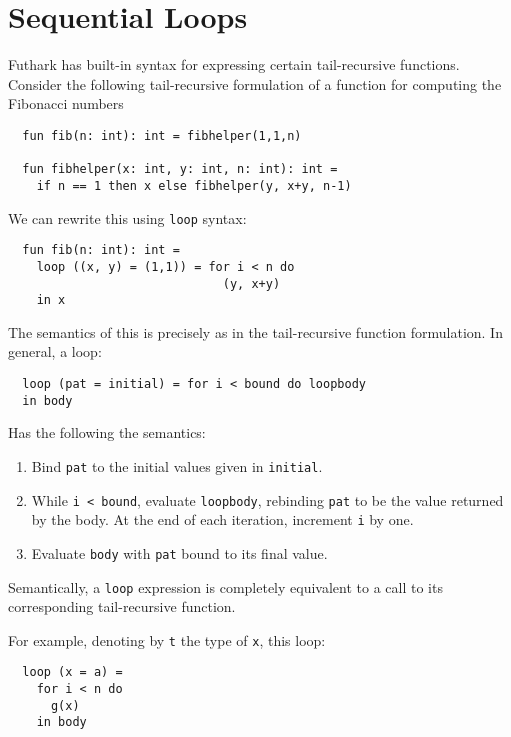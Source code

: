 \documentclass[11pt]{book}
\begin{document}
\section{Sequential Loops}
\label{sec:sequential-loops}

Futhark has built-in syntax for expressing certain tail-recursive
functions.  Consider the following tail-recursive formulation of a
function for computing the Fibonacci numbers

\begin{lstlisting}
  fun fib(n: int): int = fibhelper(1,1,n)

  fun fibhelper(x: int, y: int, n: int): int =
    if n == 1 then x else fibhelper(y, x+y, n-1)
\end{lstlisting}

We can rewrite this using \texttt{loop} syntax:

\begin{lstlisting}
  fun fib(n: int): int =
    loop ((x, y) = (1,1)) = for i < n do
                              (y, x+y)
    in x
\end{lstlisting}

The semantics of this is precisely as in the tail-recursive function
formulation.  In general, a loop:

\begin{lstlisting}
  loop (pat = initial) = for i < bound do loopbody
  in body
\end{lstlisting}

Has the following the semantics:

\begin{enumerate}
\item Bind \texttt{pat} to the initial values given in
  \texttt{initial}.
\item While \texttt{i < bound}, evaluate \texttt{loopbody}, rebinding
  \texttt{pat} to be the value returned by the body.  At the end of
  each iteration, increment \texttt{i} by one.
\item Evaluate \texttt{body} with \texttt{pat} bound to its final
  value.
\end{enumerate}

Semantically, a \texttt{loop} expression is completely equivalent to a
call to its corresponding tail-recursive function.

For example, denoting by \texttt{t} the type of \texttt{x}, this
loop:

\begin{lstlisting}
  loop (x = a) =
    for i < n do
      g(x)
    in body
\end{lstlisting}
\end{document}
